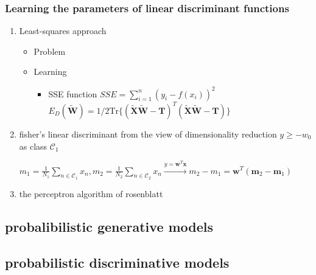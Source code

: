 \documentclass[11pt]{article}
\newcommand{\bl}[1] {\boldsymbol{#1}}
\begin{document}
\subsubsection{Learning the parameters of linear discriminant functions}
\label{sec:org0a4c7c7}
\begin{enumerate}
\item Least-squares approach
\label{sec:org384cc9d}
\begin{itemize}
\item Problem
\item Learning
\begin{itemize}
\item SSE function
\(SSE=\displaystyle\sum_{i=1}^n(y_i-f(x_i))^2\)
\(E_D(\widetilde{\bl{W}})=1/2\text{Tr}\{(\bl{\widetilde{X}\widetilde{W}-T})^T 
         (\bl{\widetilde{X}\widetilde{W}-T})\}\)
\end{itemize}
\end{itemize}
\item fisher's linear discriminant
\label{sec:orga85208a}
from the view of dimensionality reduction
\(y\ge -w_0\) as class \(\mathcal{C}_1\)

\(m_1=\frac{1}{N_1}\displaystyle\sum_{n\in\mathcal{C}_1}x_n, 
     m_2=\frac{1}{N_2}\displaystyle\sum_{n\in\mathcal{C}_2}x_n
     \xrightarrow{y=\bl{w}^T\bl{x}} m_2-m_1=\bl{w}^T(\bl{m}_2-\bl{m}_1)\)
\item the perceptron algorithm of rosenblatt
\label{sec:org909e073}
\end{enumerate}
\subsection{probalibilistic generative models}
\label{sec:org39dd59e}
\subsection{probabilistic discriminative models}
\label{sec:orgec033a6}
\end{document}
